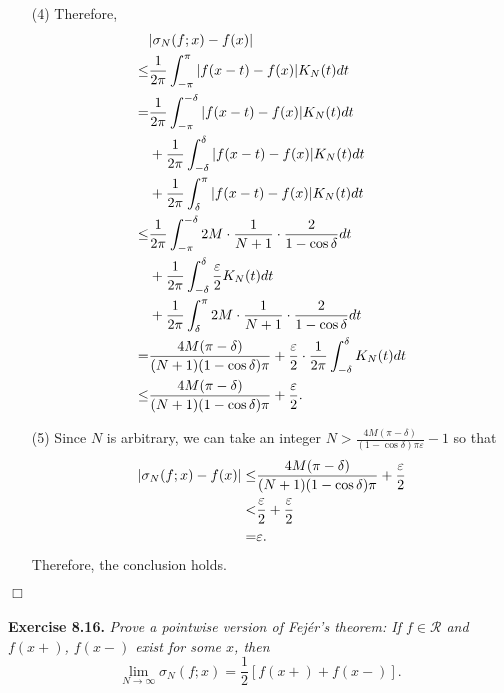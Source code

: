 \documentclass{article}
\begin{document}
\begin{enumerate}
\item[(4)]
Therefore,
  \begin{align*}
    &\abs{ \sigma_N(f;x) - f(x) } \\
    \leq& \frac{1}{2\pi} \int_{-\pi}^{\pi} |f(x-t)-f(x)| K_N(t) dt \\
    =& \frac{1}{2\pi} \int_{-\pi}^{-\delta} |f(x-t)-f(x)| K_N(t) dt \\
      &+ \frac{1}{2\pi} \int_{-\delta}^{\delta} |f(x-t)-f(x)| K_N(t) dt \\
      &+ \frac{1}{2\pi} \int_{\delta}^{\pi} |f(x-t)-f(x)| K_N(t) dt \\
    \leq& \frac{1}{2\pi} \int_{-\pi}^{-\delta}
        2M \cdot \frac{1}{N+1} \cdot \frac{2}{1-\cos \delta} dt \\
      &+ \frac{1}{2\pi} \int_{-\delta}^{\delta} \frac{\varepsilon}{2} K_N(t) dt \\
      &+ \frac{1}{2\pi} \int_{\delta}^{\pi}
        2M \cdot \frac{1}{N+1} \cdot \frac{2}{1-\cos \delta} dt \\
    =& \frac{4M (\pi - \delta)}{(N+1)(1 - \cos \delta) \pi}
      + \frac{\varepsilon}{2} \cdot \frac{1}{2\pi} \int_{-\delta}^{\delta} K_N(t) dt \\
    \leq& \frac{4M (\pi - \delta)}{(N+1)(1 - \cos \delta) \pi} + \frac{\varepsilon}{2}.
  \end{align*}

\item[(5)]
Since $N$ is arbitrary,
we can take an integer
$N > \frac{4M(\pi-\delta)}{(1-\cos\delta)\pi\varepsilon} - 1$
so that
  \begin{align*}
    \abs{ \sigma_N(f;x) - f(x) }
    \leq& \frac{4M (\pi - \delta)}{(N+1)(1 - \cos \delta) \pi} + \frac{\varepsilon}{2} \\
    <& \frac{\varepsilon}{2} + \frac{\varepsilon}{2} \\
    =& \varepsilon.
  \end{align*}
Therefore, the conclusion holds.
\end{enumerate}
$\Box$ \\\\






\textbf{Exercise 8.16.}
\emph{Prove a pointwise version of Fej\'er's theorem:
If $f \in \mathscr{R}$ and $f(x+)$, $f(x-)$ exist for some $x$, then
\[
  \lim_{N \to \infty} \sigma_N(f;x) = \frac{1}{2}[f(x+)+f(x-)].
\]
} \\
\end{document}
